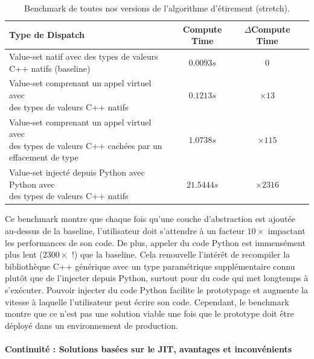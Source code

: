 \begin{table}[htbp]
  \footnotesize
  \centering
  \begin{tabular}{l|ccc}
    \toprule
    Type de Dispatch &
    Compute Time     &
    \(\Delta{}\)Compute Time
    \\ \midrule Value-set natif avec des types de valeurs C++ natifs (baseline)
                     & \(0.0093s\) & \(0\)                        \\
    \makecell[l]{Value-set comprenant un appel virtuel avec       \\ des types de valeurs C++ natifs}      &
    \(0.1213s\)      &
    \(\times 13\)
    \\
    \makecell[l]{Value-set comprenant un appel virtuel avec       \\ des types de valeurs C++ cachées par un effacement de type} &
    \(1.0738s\)      &
    \(\times 115\)
    \\
    \makecell[l]{Value-set injecté depuis Python avec Python avec \\ des types de valeurs C++ natifs} &
    \(21.5444s\)     &
    \(\times 2316\)
    \\
    \bottomrule
  \end{tabular}
  \caption[]{Benchmark de toutes nos versions de l'algorithme d'étirement (stretch).}
  \label{resume:table:static.dynamic.perfs}
\end{table}

Ce benchmark montre que chaque fois qu'une couche d'abstraction est ajoutée au-dessus de la baseline, l'utilisateur doit
s'attendre à un facteur \(10\times\) impactant les performances de son code. De plus, appeler du code Python est
immensément plus lent (\(2300\times\) !) que la baseline. Cela renouvelle l'intérêt de recompiler la bibliothèque C++
générique avec un type paramétrique supplémentaire connu plutôt que de l'injecter depuis Python, surtout pour du code
qui met longtemps à s'exécuter. Pouvoir injecter du code Python facilite le prototypage et augmente la vitesse à
laquelle l'utilisateur peut écrire son code. Cependant, le benchmark montre que ce n'est pas une solution viable une
fois que le prototype doit être déployé dans un environnement de production.

\paragraph{Continuité : Solutions basées sur le JIT, avantages et inconvénients}

